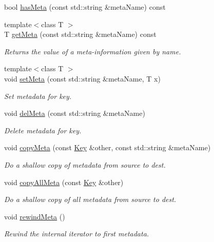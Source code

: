\begin{DoxyCompactItemize}
bool \hyperlink{classkdb_1_1Key_ae3c3228bd66be9013a8d686e57aed64b}{has\+Meta} (const std\+::string \&meta\+Name) const
\item 
{\footnotesize template$<$class T $>$ }\\T \hyperlink{classkdb_1_1Key_acdd4e81b0565756c99826bf926fd6fe4}{get\+Meta} (const std\+::string \&meta\+Name) const
\begin{DoxyCompactList}\small\item\em Returns the value of a meta-\/information given by name. \end{DoxyCompactList}\item 
{\footnotesize template$<$class T $>$ }\\void \hyperlink{classkdb_1_1Key_a4c5a3d463127ade0b766c4298002daa3}{set\+Meta} (const std\+::string \&meta\+Name, T x)
\begin{DoxyCompactList}\small\item\em Set metadata for key. \end{DoxyCompactList}\item 
void \hyperlink{classkdb_1_1Key_a2305da805095605aca38d53f2733fb57}{del\+Meta} (const std\+::string \&meta\+Name)
\begin{DoxyCompactList}\small\item\em Delete metadata for key. \end{DoxyCompactList}\item 
void \hyperlink{classkdb_1_1Key_a53f6d2196a7f17c4bdc544207bdc5f4c}{copy\+Meta} (const \hyperlink{classkdb_1_1Key}{Key} \&other, const std\+::string \&meta\+Name)
\begin{DoxyCompactList}\small\item\em Do a shallow copy of metadata from source to dest. \end{DoxyCompactList}\item 
void \hyperlink{classkdb_1_1Key_aec0910bf293db33deac6a3f81359cb48}{copy\+All\+Meta} (const \hyperlink{classkdb_1_1Key}{Key} \&other)
\begin{DoxyCompactList}\small\item\em Do a shallow copy of all metadata from source to dest. \end{DoxyCompactList}\item 
void \hyperlink{classkdb_1_1Key_a002af206119ceed17b106e2449cedc91}{rewind\+Meta} ()
\begin{DoxyCompactList}\small\item\em Rewind the internal iterator to first metadata. \end{DoxyCompactList}\item 

\end{DoxyCompactItemize}
